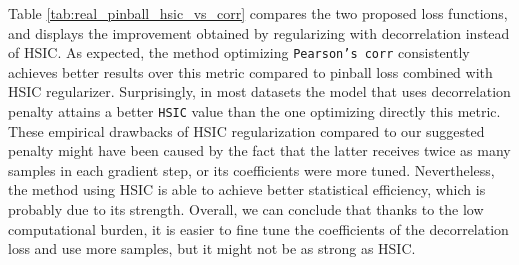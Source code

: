\documentclass{article}
\begin{document}
\begin{appendices}
\begin{table}[htbp]
{\begin{tabular}{cccccccccc}
    
    \bottomrule[1.1pt]


    \end{tabular}%
    }
  \label{tab:real_pinball_hsic_results}%
\end{table}%


Table \ref{tab:real_pinball_hsic_vs_corr} compares the two proposed loss functions, and displays the improvement obtained by regularizing with decorrelation instead of HSIC. As expected, the method optimizing \texttt{Pearson's corr} consistently achieves better results over this metric compared to pinball loss combined with HSIC regularizer. Surprisingly, in most datasets the model that uses decorrelation penalty attains a better \texttt{HSIC} value than the one optimizing directly this metric. These empirical drawbacks of HSIC regularization compared to our suggested penalty might have been caused by the fact that the latter receives twice as many samples in each gradient step, or its coefficients were more tuned. Nevertheless, the method using HSIC is able to achieve better statistical efficiency, which is probably due to its strength.
Overall, we can conclude that thanks to the low computational burden, it is easier to fine tune the coefficients of the decorrelation loss and use more samples, but it might not be as strong as HSIC.

\begin{table}[htbp]
  \centering
  \caption{
  Real data experiments. Performance of a neural network model for quantile regression, \texttt{orthogonal QR} using either ($\mathcal{R}_{\textrm{HSIC}}$) penalty or ($\mathcal{R}_{\textrm{corr}}$) penalty. Refer to the caption of Table~\ref{tab:real_pinball_results} for further details. The standard errors for coverage and width are about 0.5, 0.06, respectively. See Tables~\ref{tab:real_pb_std_errs},\ref{tab:real_pb_hsic_std_errs} for a full reporting of all standard errors.}
\end{table}
\end{appendices}
\end{document}
